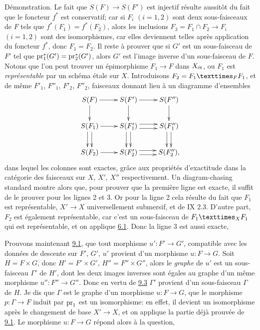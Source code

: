 \documentclass[10pt]{../fichiers-configuration-latex/smfart}
\begin{document}
\noindent
Démonstration. Le fait que $S(F)\rightarrow S(F')$ est injectif
résulte aussitôt du fait que le foncteur $f^{\ast}$ est conservatif;
car si $F_{i}$ $(i=1,2)$ sont deux sous-faisceaux de $F$ tels que
$f^{\ast}(F_{1})=f^{\ast}(F_{2})$, alors les inclusions
$F_{3}=F_{1}\cap F_{2}\rightarrow F_{i}$ $(i=1,2)$ sont des
isomorphismes, car elles deviennent telles après application du
foncteur $f^{\ast}$, donc $F_{1}=F_{2}$. Il reste à prouver que si
$G'$ est un sous-faisceau de $F'$ tel que
$\operatorname{pr}^{\ast}_{1}(G')=\operatorname{pr}^{\ast}_{2}(G')$, alors $G'$ est l'image
inverse d'un sous-faisceau de $F$. Notons que l'on peut trouver un
épimorphisme $F_{1}\rightarrow F$ dans $X_{\text{\rm ét}}$, ou
$F_{1}$ est \emph{représentable} par un schéma étale sur $X$.
Introduisons $F_{2}=\fprod{F_{1}}{F_{1}}{F}$, et de même $F'_{1}$,
$F''_{1}$, $F'_{2}$, $F''_{2}$, faisceaux donnant lieu à un
diagramme d'ensembles
\[
\xymatrix@R=.75cm{
  S(F)  \ar[r] \ar[d]& S(F') \ar[r]\ar[d] & S(F'') \ar[d]\\
S(F_1) \ar[r] \ar@<3pt>[d] \ar@<-3pt>[d]& S(F'_1) \ar@<3pt>[r]
  \ar@<-3pt>[r] \ar@<3pt>[d] \ar@<-3pt>[d]& S(F''_{1})\ar@<3pt>[d] \ar@<-3pt>[d] \\
S(F_2)  \ar[r] & S(F'_2)\ar@<3pt>[r]
  \ar@<-3pt>[r] & S(F''_2),
}
\]
dans lequel les colonnes sont exactes, grâce aux propriétés
d'exactitude dans la catégorie des faisceaux sur $X$, $X'$, $X''$
respectivement. Un diagram-chasing standard montre alors que, pour
prouver que la première ligne est exacte, il suffit de le prouver pour
les lignes 2 et 3. Or pour la ligne 2 cela résulte du fait que $F_{1}$
est représentable, $X'\rightarrow X$ universellement\pageoriginale
submersif, et de \SGA{} IX 2.3. D'autre part, $F_{2}$ est également
représentable, car c'est un sous-faisceau de $\fprod{F_{1}}{F_{1}}{X}$
qui est représentable, et on applique \hyperref[VIII.prop6.1]{6.1}. Donc la ligne 3 est aussi
exacte, \cqfd

Prouvons maintenant \hyperref[VIII.prop9.1]{9.1}, \ie que tout morphisme
$u':F'\rightarrow G'$, compatible avec les données de descente sur
$F'$, $G'$, $u'$ provient d'un morphisme $u:F\rightarrow G$. Soit
$H=F\times G$, donc $H'=F'\times G'$, $H''=F''\times G''$, alors le
\emph{graphe} de $u'$ est un sous-faisceau $\Gamma'$ de $H'$, dont
les deux images inverses sont égales au graphe d'un même morphisme
$u'':F''\rightarrow G''$. Donc en vertu de \hyperref[VIII.lem9.3]{9.3}
$\Gamma'$ provient d'un sous-faisceau $\Gamma$ de $H$. Je dis que
$\Gamma$ est le graphe d'un morphisme $u:F\rightarrow G$, \ie que le
morphisme $p:\Gamma\rightarrow F$ induit par $\operatorname{pr}_{1}$ est un
isomorphisme: en effet, il devient un isomorphisme après le
changement de base $X'\rightarrow X$, et on applique la partie déjà
prouvée de \hyperref[VIII.prop9.1]{9.1}. Le morphisme $u:F\rightarrow G$
répond alors à la question, \cqfd
\end{document}
